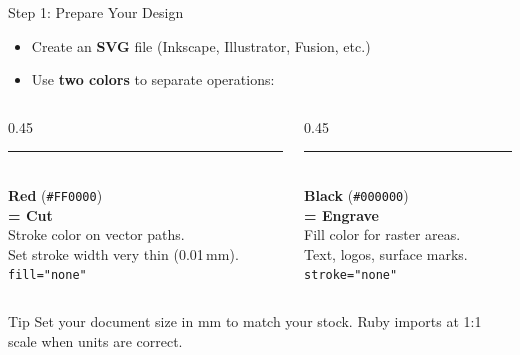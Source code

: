 \documentclass[aspectratio=169]{beamer}
\begin{document}
\begin{frame}{Step 1: Prepare Your Design}
\begin{itemize}
    \item Create an \textbf{SVG} file (Inkscape, Illustrator, Fusion, etc.)
    \item Use \textbf{two colors} to separate operations:
\end{itemize}

\vspace{0.5em}
\begin{columns}
\begin{column}{0.45\textwidth}
\centering
\textcolor{red}{\rule{2cm}{3pt}}\\[4pt]
\textbf{Red} (\texttt{\#FF0000})\\
\textbf{= Cut}\\[4pt]
{\small Stroke color on vector paths.\\
Set stroke width very thin (0.01\,mm).\\
\texttt{fill="none"}}
\end{column}
\begin{column}{0.45\textwidth}
\centering
\rule{2cm}{3pt}\\[4pt]
\textbf{Black} (\texttt{\#000000})\\
\textbf{= Engrave}\\[4pt]
{\small Fill color for raster areas.\\
Text, logos, surface marks.\\
\texttt{stroke="none"}}
\end{column}
\end{columns}

\vspace{1em}
\begin{exampleblock}{Tip}
Set your document size in mm to match your stock.
Ruby imports at 1:1 scale when units are correct.
\end{exampleblock}
\end{frame}
\end{document}
